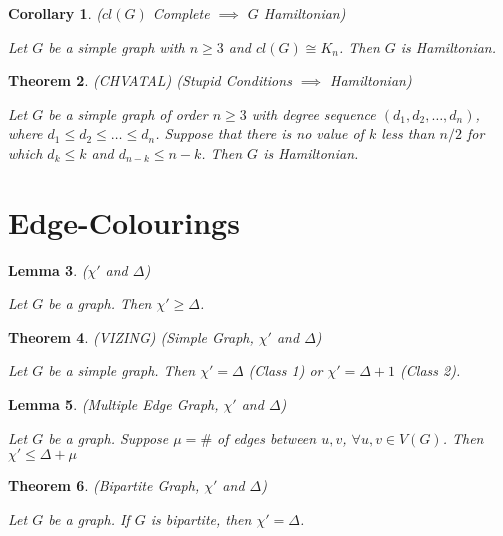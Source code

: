 \documentclass[12pt]{amsart}
\newtheorem{thm}{Theorem}
\newtheorem{lem}[thm]{Lemma}
\newtheorem{cor}[thm]{Corollary}
\theoremstyle{definition}
\begin{document}
\begin{cor} ($cl(G)$ Complete $\implies$ $G$ Hamiltonian)

Let $G$ be a simple graph with $n\geq 3$ and $cl(G)\cong K_n$. Then $G$ is Hamiltonian.
\end{cor}


\begin{thm} (CHVATAL) (Stupid Conditions $\implies$ Hamiltonian)

Let $G$ be a simple graph of order $n \geq 3$ with degree sequence $(d_1,d_2,\ldots,d_n)$, where
$d_1 \leq d_2 \leq \ldots \leq d_n$. Suppose that there is no value of $k$ less than $n/2$ for which
$d_k \leq k$ and $d_{n-k} \leq n-k$. Then $G$ is Hamiltonian.
\end{thm}

\section{Edge-Colourings}

\begin{lem} ($\chi'$ and $\Delta$)

Let $G$ be a graph. Then $\chi' \geq \Delta$.
\end{lem}

\begin{thm} (VIZING) (Simple Graph, $\chi'$ and $\Delta$)

Let $G$ be a simple graph. Then $\chi' = \Delta$ (Class 1) or $\chi' = \Delta+1$ (Class 2).
\end{thm}


\begin{lem} (Multiple Edge Graph, $\chi'$ and $\Delta$)

Let $G$ be a graph. Suppose $\mu=\#$ of edges between $u,v$, $\forall u,v\in V(G)$. Then $\chi' \leq \Delta+\mu$
\end{lem}


\begin{thm} (Bipartite Graph, $\chi'$ and $\Delta$)

Let $G$ be a graph. If $G$ is bipartite, then $\chi' = \Delta$.
\end{thm}
\end{document}
